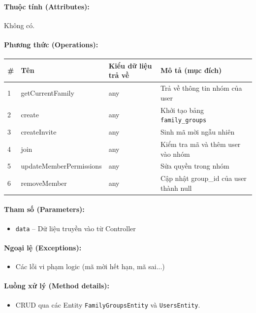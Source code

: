\documentclass[12pt,a4paper]{article}
\begin{document}
\paragraph{Thuộc tính (Attributes):}
Không có.

\paragraph{Phương thức (Operations):}
\begin{longtable}{|p{0.6cm}|p{5.0cm}|p{2.8cm}|p{5.4cm}|}
\hline
\textbf{\#} & \textbf{Tên} & \textbf{Kiểu dữ liệu trả về} & \textbf{Mô tả (mục đích)} \\ \hline
\endhead
1 & getCurrentFamily & any & Trả về thông tin nhóm của user \\ \hline
2 & create & any & Khởi tạo bảng \texttt{family\_groups} \\ \hline
3 & createInvite & any & Sinh mã mời ngẫu nhiên \\ \hline
4 & join & any & Kiểm tra mã và thêm user vào nhóm \\ \hline
5 & updateMemberPermissions & any & Sửa quyền trong nhóm \\ \hline
6 & removeMember & any & Cập nhật group\_id của user thành null \\ \hline
\end{longtable}

\paragraph{Tham số (Parameters):}
\begin{itemize}[leftmargin=*]
    \item \texttt{data} – Dữ liệu truyền vào từ Controller
\end{itemize}


\paragraph{Ngoại lệ (Exceptions):}
\begin{itemize}[leftmargin=*]
    \item Các lỗi vi phạm logic (mã mời hết hạn, mã sai...)
\end{itemize}


\paragraph{Luồng xử lý (Method details):}
\begin{itemize}[leftmargin=*]
    \item CRUD qua các Entity \texttt{FamilyGroupsEntity} và \texttt{UsersEntity}.
\end{itemize}
\end{document}
